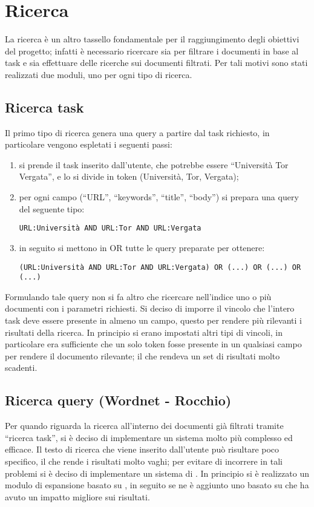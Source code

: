 \section{Ricerca}\label{cap:retrival:searcher}
La ricerca è un altro tassello fondamentale per il raggiungimento degli obiettivi del progetto; infatti è necessario ricercare sia per filtrare i documenti in base al task e sia effettuare delle ricerche sui documenti filtrati. Per tali motivi sono stati realizzati due moduli, uno per ogni tipo di ricerca.
\subsection{Ricerca task}
Il primo tipo di ricerca genera una query a partire dal task richiesto, in particolare vengono espletati i seguenti passi:
\begin{enumerate}
\item si prende il task inserito dall'utente, che potrebbe essere ``Università Tor Vergata'', e lo si divide in token (Università, Tor, Vergata);
\item per ogni campo (``URL'', ``keywords'', ``title'', ``body'') si prepara una query del seguente tipo:
\begin{center}
\texttt{URL:Università AND URL:Tor AND URL:Vergata}
\end{center}
\item in seguito si mettono in OR tutte le query preparate per ottenere:
\begin{center}
\texttt{(URL:Università AND URL:Tor AND URL:Vergata) OR (...) OR (...) OR (...)}
\end{center}
\end{enumerate}
Formulando tale query non si fa altro che ricercare nell'indice uno o più documenti con i parametri richiesti. Si deciso di imporre il vincolo che l'intero task deve essere presente in almeno un campo, questo per rendere più rilevanti i risultati della ricerca. In principio si erano impostati altri tipi di vincoli, in particolare era sufficiente che un solo token fosse presente in un qualsiasi campo per rendere il documento rilevante; il che rendeva un set di risultati molto scadenti.
\subsection{Ricerca query (Wordnet - Rocchio)}
Per quando riguarda la ricerca all'interno dei documenti già filtrati tramite ``ricerca task'', si è deciso di implementare un sistema molto più complesso ed efficace. Il testo di ricerca che viene inserito dall'utente può risultare poco specifico, il che rende i risultati molto vaghi; per evitare di incorrere in tali problemi si è deciso di implementare un sistema di . In principio si è realizzato un modulo di espansione basato su , in seguito se ne è aggiunto uno basato su  che ha avuto un impatto migliore sui risultati.

